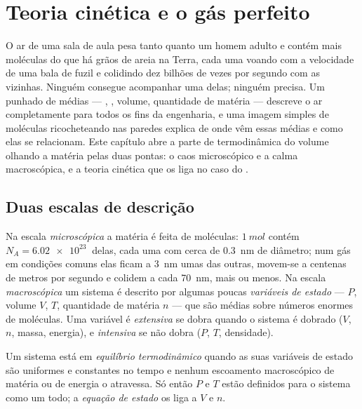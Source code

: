 \chapter{Teoria cinética e o gás perfeito}\label{ch:b1:kinetic-theory}

O ar de uma sala de aula pesa tanto quanto um homem adulto e contém mais
moléculas do que há grãos de areia na Terra, cada uma voando com a
velocidade de uma bala de fuzil e colidindo dez bilhões de vezes por
segundo com as vizinhas. Ninguém consegue acompanhar uma delas; ninguém
precisa. Um punhado de médias --- , , volume, quantidade
de matéria --- descreve o ar completamente para todos os fins da
engenharia, e uma imagem simples de moléculas ricocheteando nas paredes
explica de onde vêm essas médias e como elas se relacionam. Este capítulo
abre a parte de termodinâmica do volume olhando a matéria pelas duas
pontas: o caos microscópico e a calma macroscópica, e a teoria cinética que
os liga no caso do .

\section{Duas escalas de descrição}

\begin{definition}\label{def:b1:kinetic-theory:scales}
Na escala \emph{microscópica} a matéria é feita de moléculas: $\qty{1}{mol}$
contém $N_A = \qty{6.02e23}{}$ delas, cada uma com cerca de \qty{0.3}{nm} de
diâmetro; num gás em condições comuns elas ficam a \qty{3}{nm} umas das
outras, movem-se a centenas de metros por segundo e colidem a cada
\qty{70}{nm}, mais ou menos.
Na escala \emph{macroscópica} um sistema é descrito por algumas poucas
\emph{variáveis de estado} ---  $P$, volume $V$,  $T$,
quantidade de matéria $n$ --- que são médias sobre números enormes de
moléculas. Uma variável é \emph{extensiva} se dobra quando o sistema é
dobrado ($V$, $n$, massa, energia), e \emph{intensiva} se não dobra
($P$, $T$, densidade).
\end{definition}

\begin{definition}\label{def:b1:kinetic-theory:equilibrium}
Um sistema está em \emph{equilíbrio termodinâmico} quando as suas variáveis
de estado são uniformes e constantes no tempo e nenhum escoamento
macroscópico de matéria ou de energia o atravessa. Só então $P$ e $T$ estão
definidos para o sistema como um todo; a \emph{equação de estado} os liga a
$V$ e $n$.
\end{definition}

